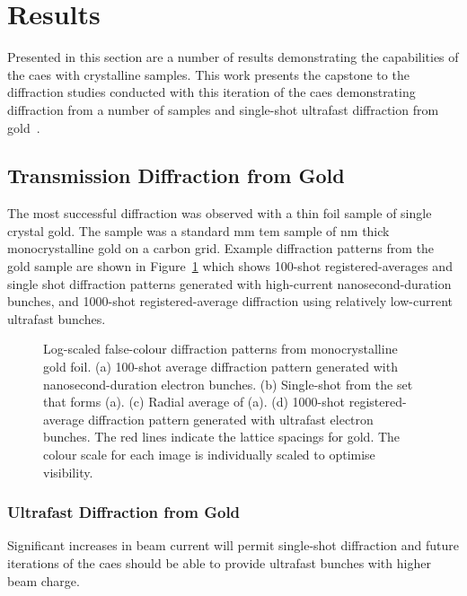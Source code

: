 \section{Results}

Presented in this section are a number of results demonstrating the capabilities of the \gls{caes} with crystalline samples.
This work presents the capstone to the diffraction studies conducted with this iteration of the \gls{caes} demonstrating diffraction from a number of samples and single-shot ultrafast diffraction from gold~\cite{speirs_single-shot_2015}.

\subsection{Transmission Diffraction from Gold}

The most successful diffraction was observed with a thin foil sample of single crystal gold.
The sample was a standard \unit[3]{mm} \gls{tem} sample of \unit[11]{nm} thick monocrystalline gold on a carbon grid.
Example diffraction patterns from the gold sample are shown in Figure~\ref{figure:au_diffraction} which shows 100-shot registered-averages and single shot diffraction patterns generated with high-current nanosecond-duration bunches, and 1000-shot registered-average diffraction using relatively low-current ultrafast bunches.

\begin{figure}
    \center
    
    \caption[Diffraction patterns from gold.]{Log-scaled false-colour diffraction patterns from monocrystalline gold foil. (a) 100-shot average diffraction pattern generated with nanosecond-duration electron bunches. (b) Single-shot from the set that forms (a). (c) Radial average of (a). (d) 1000-shot registered-average diffraction pattern generated with ultrafast electron bunches. The red lines indicate the lattice spacings for gold. The colour scale for each image is individually scaled to optimise visibility.}
    \label{figure:au_diffraction}
\end{figure}

\subsubsection{Ultrafast Diffraction from Gold}

Significant increases in beam current will permit single-shot diffraction and future iterations of the \gls{caes} should be able to provide ultrafast bunches with higher beam charge.

